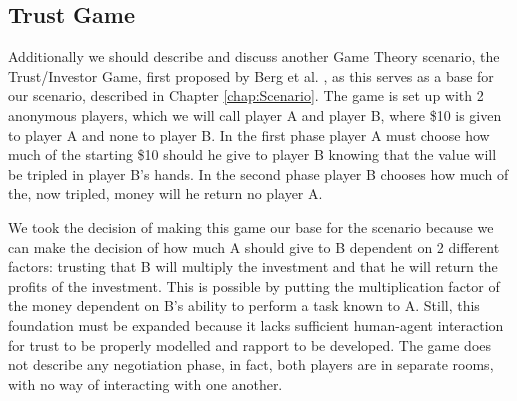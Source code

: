 \subsection{Trust Game}
Additionally we should describe and discuss another Game Theory scenario, the Trust/Investor Game, first proposed by Berg et al. \cite{JoyceBergJohnDickhaut}, as this serves as a base for our scenario, described in Chapter \ref{chap:Scenario}. The game is set up with 2 anonymous players, which we will call player A and player B, where \$10 is given to player A and none to player B. In the first phase player A must choose how much of the starting \$10 should he give to player B knowing that the value will be tripled in player B’s hands. In the second phase player B chooses how much of the, now tripled, money will he return no player A.

We took the decision of making this game our base for the scenario because we can make the decision of how much A should give to B dependent on 2 different factors: trusting that B will multiply the investment and that he will return the profits of the investment. This is possible by putting the multiplication factor of the money dependent on B's ability to perform a task known to A.
Still, this foundation must be expanded because it lacks sufficient human-agent interaction for trust to be properly modelled and rapport to be developed. The game does not describe any negotiation phase, in fact, both players are in separate rooms, with no way of interacting with one another.